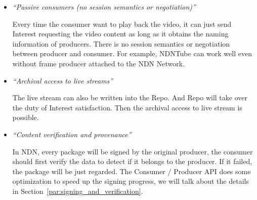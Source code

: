 \begin{itemize}
\item{\textit{``Passive consumers (no session semantics or negotiation)''}}

Every time the consumer want to play back the video, it can just send Interest requesting the video content as long as it obtains the naming information of producers. There is no session semantics or negotiation between producer and consumer. For example, NDNTube can work well even without frame producer attached to the NDN Network.

\item{\textit{``Archival access to live streams''}}

The live stream can also be written into the Repo. And Repo will take over the duty of Interest satisfaction. Then the archival access to live stream is possible.

\item{\textit{``Content verification and provenance''}}

In NDN, every package will be signed by the original producer, the consumer should first verify the data to detect if it belongs to the producer. If it failed, the package will be just regarded. The Consumer / Producer API does some optimization to speed up the signing progress, we will talk about the details in Section~\ref{par:signing_and_verification}.

\end{itemize} 

